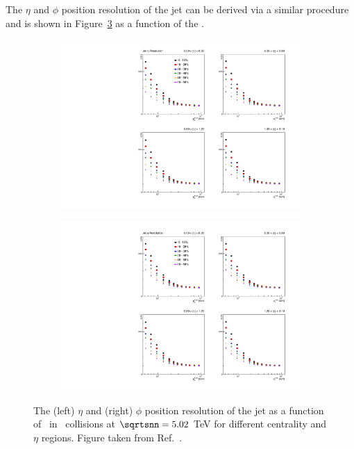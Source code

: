 The $\eta$ and $\phi$ position resolution of the jet can be derived via a similar procedure and is shown in Figure~\ref{fig:jet_posResolution} as a function of the \pttruth.



\begin{figure}
\centering
\begin{subfigure}{.45\textwidth}
  \centering
  \includegraphics[width=\linewidth]{figures/setup/jet_res_eta_r04.pdf}
          \caption{}
          \label{fig:nch_fcal}
\end{subfigure}
\qquad  \qquad  
\begin{subfigure}{.45\textwidth}  
  \centering
  \includegraphics[width=\linewidth]{figures/setup/jet_res_phi_r04.pdf}
          \caption{}
          \label{fig:fcal_distr}
\end{subfigure}
\caption{The (left) $\eta$ and (right) $\phi$ position resolution of the jet as a function of \pttruth\ in \pbpb\ collisions at $\sqrtsnn = 5.02$ TeV for different centrality and $\eta$ regions.
Figure taken from Ref.~\cite{Puri:2304504}.}
\label{fig:jet_posResolution}
\end{figure}




